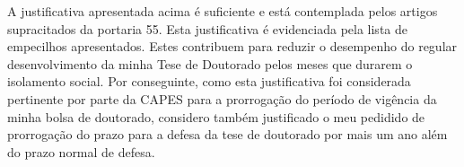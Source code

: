 A justificativa apresentada acima é suficiente e está contemplada pelos artigos supracitados da portaria 55. Esta justificativa é evidenciada pela lista de empecilhos apresentados. Estes contribuem para reduzir o desempenho do regular desenvolvimento da minha Tese de Doutorado pelos meses que durarem o isolamento social. Por conseguinte, como esta
justificativa foi considerada pertinente por parte da CAPES para a prorrogação do período de vigência da minha bolsa
de doutorado, considero também justificado o meu pedidido de prorrogação do prazo para a defesa da tese de doutorado por mais
um ano além do prazo normal de defesa.
